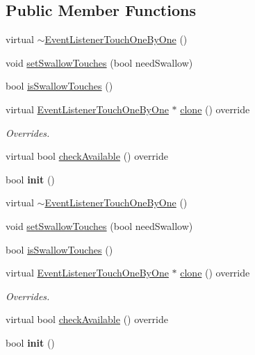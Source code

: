 \subsection*{Public Member Functions}
\begin{DoxyCompactItemize}
\item 
virtual \hyperlink{classEventListenerTouchOneByOne_a6c2f83789b664808c1bf06865e1cfb8d}{$\sim$\+Event\+Listener\+Touch\+One\+By\+One} ()
\item 
void \hyperlink{classEventListenerTouchOneByOne_a8638cf4b703328f5eba6b88cd03c46b2}{set\+Swallow\+Touches} (bool need\+Swallow)
\item 
bool \hyperlink{classEventListenerTouchOneByOne_adf899a1cdee4d5db1a7cb3e159fe648e}{is\+Swallow\+Touches} ()
\item 
\mbox{\label{classEventListenerTouchOneByOne_ab6fd6db6eefeb57abf3f0aca46d0b5c8}} 
virtual \hyperlink{classEventListenerTouchOneByOne}{Event\+Listener\+Touch\+One\+By\+One} $\ast$ \hyperlink{classEventListenerTouchOneByOne_ab6fd6db6eefeb57abf3f0aca46d0b5c8}{clone} () override
\begin{DoxyCompactList}\small\item\em Overrides. \end{DoxyCompactList}\item 
virtual bool \hyperlink{classEventListenerTouchOneByOne_af14f012850827bf3464369245611c05e}{check\+Available} () override
\item 
\mbox{\label{classEventListenerTouchOneByOne_a34c90c9e324765d8090f996c56f463fe}} 
bool {\bfseries init} ()
\item 
virtual \hyperlink{classEventListenerTouchOneByOne_a2726a5429d18053e7bd315e29f093a14}{$\sim$\+Event\+Listener\+Touch\+One\+By\+One} ()
\item 
void \hyperlink{classEventListenerTouchOneByOne_a8638cf4b703328f5eba6b88cd03c46b2}{set\+Swallow\+Touches} (bool need\+Swallow)
\item 
bool \hyperlink{classEventListenerTouchOneByOne_adf899a1cdee4d5db1a7cb3e159fe648e}{is\+Swallow\+Touches} ()
\item 
\mbox{\label{classEventListenerTouchOneByOne_aeb19046f96745ff3cb49ba4ee92a8335}} 
virtual \hyperlink{classEventListenerTouchOneByOne}{Event\+Listener\+Touch\+One\+By\+One} $\ast$ \hyperlink{classEventListenerTouchOneByOne_aeb19046f96745ff3cb49ba4ee92a8335}{clone} () override
\begin{DoxyCompactList}\small\item\em Overrides. \end{DoxyCompactList}\item 
virtual bool \hyperlink{classEventListenerTouchOneByOne_a013a626d35805cc6ca030d9f9883610b}{check\+Available} () override
\item 
\mbox{\label{classEventListenerTouchOneByOne_a34c90c9e324765d8090f996c56f463fe}} 
bool {\bfseries init} ()
\end{DoxyCompactItemize}
